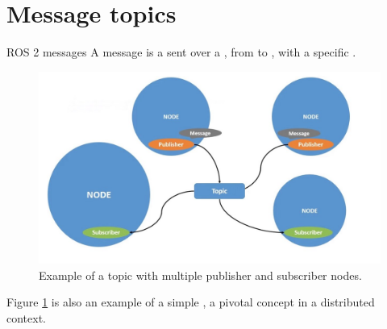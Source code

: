 
\section{Message topics}
\graphicspath{{figs/section3/}}

\begin{frame}{ROS 2 messages}
	A message is a  sent over a , from  to , with a specific .
	\begin{figure}
		\centering
		\includegraphics[scale=.16]{ros2Msg.jpg}
		\caption{Example of a topic with multiple publisher and subscriber nodes.}
		\label{fig:msg}
	\end{figure}
  Figure \ref{fig:msg} is also an example of a simple , a pivotal concept in a distributed context.
\end{frame}


